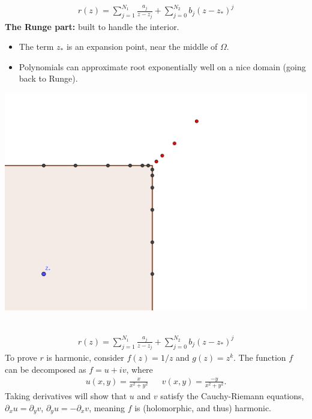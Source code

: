 \documentclass{seminar}
\begin{document}
\begin{slide} %
{} \small \\
\begin{align*}
r(z)= \sum_{j=1}^{N_1} \frac{a_j}{z-z_j} + \sum_{j=0}^{N_2} b_j (z-z_*)^j
\end{align*}
\textbf{The Runge part:} built to handle the interior.
\begin{multicols}{2}
\begin{itemize}
	\item The term $z_*$ is an expansion point, near the middle of $\Omega$.
	\item Polynomials can approximate root exponentially well on a nice domain (going back to Runge).
\end{itemize}
\includegraphics[scale=4]{./PNG/corner_nodes_illust}
\end{multicols}
\end{slide} %




\begin{slide} %
{} \small \\
\begin{align*}
r(z)= \sum_{j=1}^{N_1} \frac{a_j}{z-z_j} + \sum_{j=0}^{N_2} b_j (z-z_*)^j
\end{align*}
To prove $r$ is harmonic, consider $f(z)=1/z$ and $g(z)=z^k$.
The function $f$ can be decomposed as $f=u+iv$, where
\begin{align*}
u(x,y)=\frac{x}{x^2+y^2} &&
v(x,y)=\frac{-y}{x^2+y^2}.
\end{align*}
Taking derivatives will show that $u$ and $v$ satisfy the Cauchy-Riemann equations, ${\partial}_x u={\partial}_y v$, ${\partial}_y u=-{\partial}_x v$, meaning $f$ is (holomorphic, and thus) harmonic.
\end{slide} %
\end{document}
